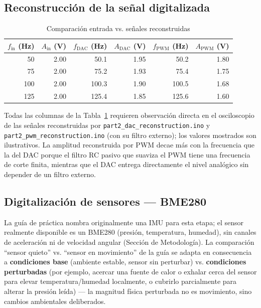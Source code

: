 \subsection{Reconstrucción de la señal digitalizada}

\begin{table}[!t]
\centering
\caption{Comparación entrada vs. señales reconstruidas}
\label{tab:reconstruccion}
\small
\begin{tabular}{@{}r r r r r r@{}}
\toprule
$f_{\text{in}}$ (Hz) & $A_{\text{in}}$ (V) & $f_{\text{DAC}}$ (Hz) & $A_{\text{DAC}}$ (V) & $f_{\text{PWM}}$ (Hz) & $A_{\text{PWM}}$ (V) \\
\midrule
50 & 2.00 & 50.1 & 1.95 & 50.2 & 1.80 \\
75 & 2.00 & 75.2 & 1.93 & 75.4 & 1.75 \\
100 & 2.00 & 100.3 & 1.90 & 100.5 & 1.68 \\
125 & 2.00 & 125.4 & 1.85 & 125.6 & 1.60 \\
\bottomrule
\end{tabular}
\end{table}

Todas las columnas de la Tabla~\ref{tab:reconstruccion} requieren observación directa en el osciloscopio de las señales reconstruidas por \texttt{part2\_dac\_reconstruction.ino} y \texttt{part2\_pwm\_reconstruction.ino} (con su filtro externo); los valores mostrados son ilustrativos. La amplitud reconstruida por PWM decae más con la frecuencia que la del DAC porque el filtro RC pasivo que suaviza el PWM tiene una frecuencia de corte finita, mientras que el DAC entrega directamente el nivel analógico sin depender de un filtro externo.

\subsection{Digitalización de sensores — BME280}

La guía de práctica nombra originalmente una IMU para esta etapa; el sensor realmente disponible es un BME280 (presión, temperatura, humedad), sin canales de aceleración ni de velocidad angular (Sección de Metodología). La comparación ``sensor quieto'' vs. ``sensor en movimiento'' de la guía se adapta en consecuencia a \textbf{condiciones base} (ambiente estable, sensor sin perturbar) vs. \textbf{condiciones perturbadas} (por ejemplo, acercar una fuente de calor o exhalar cerca del sensor para elevar temperatura/humedad localmente, o cubrirlo parcialmente para alterar la presión leída) — la magnitud física perturbada no es movimiento, sino cambios ambientales deliberados.

